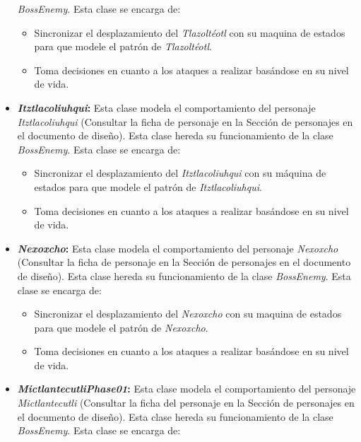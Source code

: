 \begin{itemize}
			\textit{BossEnemy}. Esta clase se encarga de:  
			\begin{itemize}
				\item Sincronizar el desplazamiento del \textit{Tlazoltéotl} con su maquina 
				de estados para que modele el patrón de \textit{Tlazoltéotl}.
				\item Toma decisiones en cuanto a los ataques a realizar basándose en su 
				nivel de vida.
			\end{itemize}
			\item \textbf{\textit{Itztlacoliuhqui}:} Esta clase modela el comportamiento del personaje 
			\textit{Itztlacoliuhqui} (Consultar la ficha de personaje en la Sección de personajes en 
			el documento de diseño). Esta clase hereda su funcionamiento de la clase 
			\textit{BossEnemy}. Esta clase se encarga de:  
			\begin{itemize}
				\item Sincronizar el desplazamiento del \textit{Itztlacoliuhqui} con su máquina 
				de estados para que modele el patrón de \textit{Itztlacoliuhqui}.
				\item Toma decisiones en cuanto a los ataques a realizar basándose en su 
				nivel de vida.
			\end{itemize}
			\item \textbf{\textit{Nexoxcho}:} Esta clase modela el comportamiento del personaje 
			\textit{Nexoxcho} (Consultar la ficha de personaje en la Sección de personajes en 
			el documento de diseño). Esta clase hereda su funcionamiento de la clase 
			\textit{BossEnemy}. Esta clase se encarga de:  
			\begin{itemize}
				\item Sincronizar el desplazamiento del \textit{Nexoxcho} con su maquina 
				de estados para que modele el patrón de \textit{Nexoxcho}.
				\item Toma decisiones en cuanto a los ataques a realizar basándose en su 
				nivel de vida.
			\end{itemize}
			\item \textbf{\textit{MictlantecutliPhase01}:} Esta clase modela el 
			comportamiento del personaje \textit{Mictlantecutli} (Consultar la ficha 
			del personaje en la Sección de personajes en 
			el documento de diseño). Esta clase hereda su funcionamiento de la clase 
			\textit{BossEnemy}. Esta clase se encarga de:  
			\begin{itemize}

\end{itemize}
\end{itemize}
